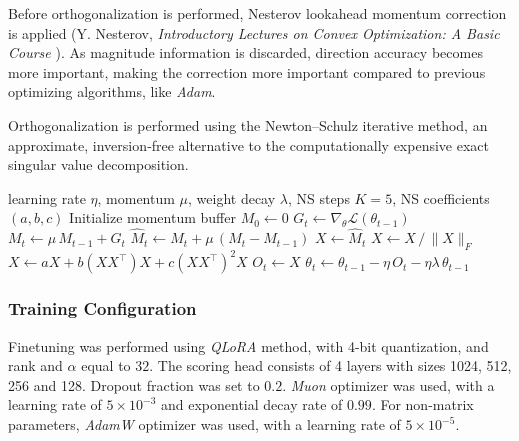 \documentclass[a4paper,11pt,twoside]{report}
\theoremstyle{definition}
\begin{document}
Before orthogonalization is performed, Nesterov lookahead momentum correction is applied (Y. Nesterov, \textit{Introductory Lectures on Convex Optimization: A Basic Course} \cite{nesterov2004introductory}). As magnitude information is discarded, direction accuracy becomes more important, making the correction more important compared to previous optimizing algorithms, like \textit{Adam}.

Orthogonalization is performed using the Newton–Schulz iterative method, an approximate, inversion‑free alternative to the computationally expensive exact singular value decomposition. 

\begin{algorithm}[h]
\caption{Muon optimizer (for 2D hidden-layer parameters)}
\label{algorithm:muon}
\begin{algorithmic}[1]
\REQUIRE learning rate $\eta$, momentum $\mu$, weight decay $\lambda$, NS steps $K=5$, NS coefficients $(a,b,c)$
\STATE Initialize momentum buffer $M_0 \gets 0$
    \STATE $G_t \gets \nabla_\theta \mathcal{L}(\theta_{t-1})$ \hfill {}
    \STATE $M_t \gets \mu \, M_{t-1} + G_t$ \hfill {}
    \STATE $\hat{M}_t \gets M_t + \mu \, (M_t - M_{t-1})$ \hfill {}
    \STATE $X \gets \hat{M}_t$ \hfill {}
    \STATE $X \gets X \,/\, \|X\|_F$ \hfill {}
        \STATE $X \gets a X + b (X X^\top) X + c (X X^\top)^2 X$
    \ENDFOR
    \STATE $O_t \gets X$ \hfill {}
    \STATE $\theta_t \gets \theta_{t-1} - \eta \, O_t - \eta \lambda \, \theta_{t-1}$ \hfill {}
\ENDFOR
\end{algorithmic}
\end{algorithm}

\subsubsection{Training Configuration}

Finetuning was performed using \textit{QLoRA} method, with 4-bit quantization, and rank and $\alpha$ equal to $32$. The scoring head consists of 4 layers with sizes 1024, 512, 256 and 128. Dropout fraction was set to $0.2$. \textit{Muon} optimizer was used, with a learning rate of $5 \times 10^{-3}$ and exponential decay rate of $0.99$. For non-matrix parameters, \textit{AdamW} optimizer was used, with a learning rate of $5 \times 10^{-5}$.
\end{document}
